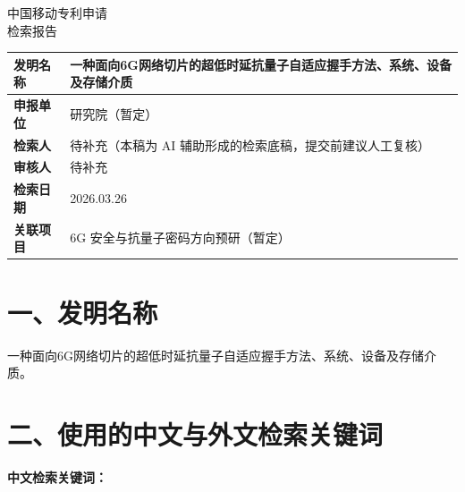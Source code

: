 \documentclass[12pt,a4paper]{article}
\begin{document}
\begin{center}
    {\Huge\heiti 中国移动专利申请} \\[0.5em]
    {\Huge\heiti 检索报告} \\[1em]
\end{center}

\begin{table}[h]
    \centering
    \renewcommand{\arraystretch}{2}
    \begin{tabular}{|p{3cm}|p{12cm}|}
        \hline
        \textbf{发明名称} & 一种面向6G网络切片的超低时延抗量子自适应握手方法、系统、设备及存储介质 \\
        \hline
        \textbf{申报单位} & 研究院（暂定） \\
        \hline
        \textbf{检索人} & 待补充（本稿为 AI 辅助形成的检索底稿，提交前建议人工复核） \\
        \hline
        \textbf{审核人} & 待补充 \\
        \hline
        \textbf{检索日期} & 2026.03.26 \\
        \hline
        \textbf{关联项目} & 6G 安全与抗量子密码方向预研（暂定） \\
        \hline
    \end{tabular}
\end{table}

\noindent{}

\vspace{1em}

\section*{一、发明名称}

一种面向6G网络切片的超低时延抗量子自适应握手方法、系统、设备及存储介质。

\section*{二、使用的中文与外文检索关键词}

\textbf{中文检索关键词：}
\end{document}
